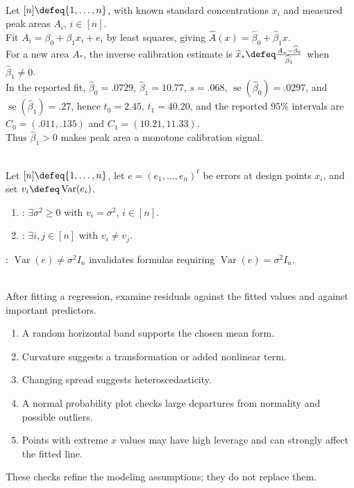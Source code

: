 \begin{example} \label{ex:peak-area-simple-regression-summary} \\
Let $[n]\defeq\{1,\ldots,n\}$, with known standard concentrations $x_i$ and measured peak areas $A_i$, $i\in[n]$.\\
Fit $A_i=\beta_0+\beta_1x_i+e_i$ by least squares, giving $\widehat{A}(x)=\widehat{\beta}_0+\widehat{\beta}_1x$.\\
For a new area $A_\ast$, the inverse calibration estimate is $\widehat{x}_\ast\defeq\frac{A_\ast-\widehat{\beta}_0}{\widehat{\beta}_1}$ when $\widehat{\beta}_1\neq0$.\\
In the reported fit, $\widehat{\beta}_0=.0729$, $\widehat{\beta}_1=10.77$, $s=.068$, $\operatorname{se}(\widehat{\beta}_0)=.0297$, and $\operatorname{se}(\widehat{\beta}_1)=.27$, hence $t_0=2.45$, $t_1=40.20$, and the reported $95\%$ intervals are $C_0=(.011,.135)$ and $C_1=(10.21,11.33)$.\\
Thus $\widehat{\beta}_1>0$ makes peak area a monotone calibration signal.
\end{example}

\begin{definition} \label{def:homoscedastic-and-heteroscedastic-errors} \\
Let $[n]\defeq\{1,\ldots,n\}$, let $e=(e_1,\ldots,e_n)^t$ be errors at design points $x_i$, and set $v_i\defeq\operatorname{Var}(e_i)$.
\begin{enumerate}[label=(\roman*)]
\setlength{\itemsep}{0pt}
\item {}: $\exists\sigma^2\geq0$ with $v_i=\sigma^2$, $i\in[n]$.
\item {}: $\exists i,j\in[n]$ with $v_i\neq v_j$.
\end{enumerate}
: $\operatorname{Var}(e)\neq\sigma^2I_n$ invalidates formulas requiring $\operatorname{Var}(e)=\sigma^2I_n$.
\end{definition}

\begin{method} \label{meth:regression-residual-diagnostics} \\
After fitting a regression, examine residuals against the fitted values and against important predictors.
\begin{enumerate}[label=(\roman*)]
\setlength{\itemsep}{0pt}
\item A random horizontal band supports the chosen mean form.
\item Curvature suggests a transformation or added nonlinear term.
\item Changing spread suggests heteroscedasticity.
\item A normal probability plot checks large departures from normality and possible outliers.
\item Points with extreme $x$ values may have high leverage and can strongly affect the fitted line.
\end{enumerate}
These checks refine the modeling assumptions; they do not replace them.
\end{method}

